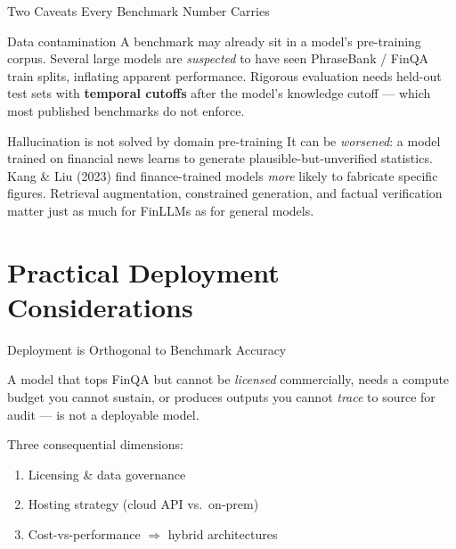\documentclass[9pt,t]{beamer}
\begin{document}
\begin{frame}{Two Caveats Every Benchmark Number Carries}
\begin{alertblock}{Data contamination}
A benchmark may already sit in a model's pre-training corpus. Several large models
are \emph{suspected} to have seen PhraseBank / FinQA train splits, inflating apparent
performance. Rigorous evaluation needs held-out test sets with \textbf{temporal
cutoffs} after the model's knowledge cutoff --- which most published benchmarks do
not enforce.
\end{alertblock}

\medskip
\begin{alertblock}{Hallucination is not solved by domain pre-training}
It can be \emph{worsened}: a model trained on financial news learns to generate
plausible-but-unverified statistics. Kang \& Liu (2023) find finance-trained models
\emph{more} likely to fabricate specific figures. Retrieval augmentation, constrained
generation, and factual verification matter just as much for FinLLMs as for general
models.
\end{alertblock}
\end{frame}

\section{Practical Deployment Considerations}

\begin{frame}{Deployment is Orthogonal to Benchmark Accuracy}
\begin{bigpicture}
A model that tops FinQA but cannot be \emph{licensed} commercially, needs a compute
budget you cannot sustain, or produces outputs you cannot \emph{trace} to source for
audit --- is not a deployable model.
\end{bigpicture}

\medskip
Three consequential dimensions:
\begin{enumerate}
  \item Licensing \& data governance
  \item Hosting strategy (cloud API vs.\ on-prem)
  \item Cost-vs-performance $\Rightarrow$ hybrid architectures
\end{enumerate}
\end{frame}
\end{document}
